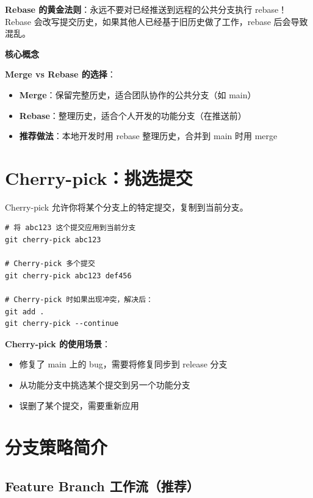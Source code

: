 \documentclass[12pt,a4paper,openany]{ctexbook}
\newenvironment{keybox}{%
  \medskip
  \noindent\textbf{\faKey\; 核心概念}
  \smallskip
}{%
  \medskip
}
\begin{document}
\begin{warnbox}
\textbf{Rebase 的黄金法则}：永远不要对已经推送到远程的公共分支执行 rebase！
Rebase 会改写提交历史，如果其他人已经基于旧历史做了工作，rebase 后会导致混乱。
\end{warnbox}

\begin{keybox}
\textbf{Merge vs Rebase 的选择}：
\begin{itemize}
  \item \textbf{Merge}：保留完整历史，适合团队协作的公共分支（如 main）
  \item \textbf{Rebase}：整理历史，适合个人开发的功能分支（在推送前）
  \item \textbf{推荐做法}：本地开发时用 rebase 整理历史，合并到 main 时用 merge
\end{itemize}
\end{keybox}

\section{Cherry-pick：挑选提交}

Cherry-pick 允许你将某个分支上的特定提交，复制到当前分支。

\begin{lstlisting}[style=shell]
# 将 abc123 这个提交应用到当前分支
git cherry-pick abc123

# Cherry-pick 多个提交
git cherry-pick abc123 def456

# Cherry-pick 时如果出现冲突，解决后：
git add .
git cherry-pick --continue
\end{lstlisting}

\begin{infobox}
\textbf{Cherry-pick 的使用场景}：
\begin{itemize}
  \item 修复了 main 上的 bug，需要将修复同步到 release 分支
  \item 从功能分支中挑选某个提交到另一个功能分支
  \item 误删了某个提交，需要重新应用
\end{itemize}
\end{infobox}

\section{分支策略简介}

\subsection{Feature Branch 工作流（推荐）}
\end{document}
